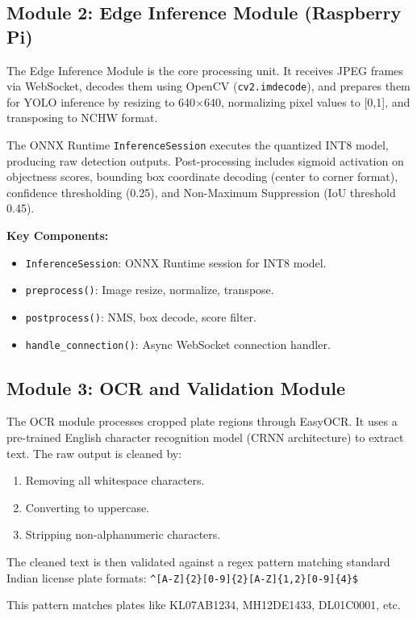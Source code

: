 \documentclass[11pt]{report}
\begin{document}
\subsection{Module 2: Edge Inference Module (Raspberry Pi)}
The Edge Inference Module is the core processing unit. It receives JPEG frames via WebSocket, decodes them using OpenCV (\texttt{cv2.imdecode}), and prepares them for YOLO inference by resizing to 640$\times$640, normalizing pixel values to [0,1], and transposing to NCHW format.

The ONNX Runtime \texttt{InferenceSession} executes the quantized INT8 model, producing raw detection outputs. Post-processing includes sigmoid activation on objectness scores, bounding box coordinate decoding (center to corner format), confidence thresholding (0.25), and Non-Maximum Suppression (IoU threshold 0.45).

\textbf{Key Components:}
\begin{itemize}
    \item \texttt{InferenceSession}: ONNX Runtime session for INT8 model.
    \item \texttt{preprocess()}: Image resize, normalize, transpose.
    \item \texttt{postprocess()}: NMS, box decode, score filter.
    \item \texttt{handle\_connection()}: Async WebSocket connection handler.
\end{itemize}

\subsection{Module 3: OCR and Validation Module}
The OCR module processes cropped plate regions through EasyOCR. It uses a pre-trained English character recognition model (CRNN architecture) to extract text. The raw output is cleaned by:
\begin{enumerate}
    \item Removing all whitespace characters.
    \item Converting to uppercase.
    \item Stripping non-alphanumeric characters.
\end{enumerate}

The cleaned text is then validated against a regex pattern matching standard Indian license plate formats: \texttt{\^{}[A-Z]\{2\}[0-9]\{2\}[A-Z]\{1,2\}[0-9]\{4\}\$}

This pattern matches plates like KL07AB1234, MH12DE1433, DL01C0001, etc.
\end{document}
